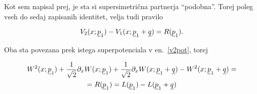 Kot sem napisal prej, je sta si supersimetri\v cna partnerja "`podobna"'. Torej poleg vseh do sedaj zapisanih
identitet, velja tudi pravilo

\begin{equation}
	V_2 (x; \underline{p}_1) - V_1 (x; \underline{p}_1 + \underline{q}) = R (\underline{p}_1).
\end{equation}

Oba sta povezana prek istega superpotenciala v en.~\eqref{v2pot}, torej

\begin{multline}
	W^2 (x; \underline{p}_1) + \frac{1}{\sqrt{2}}\partial_x W(x; \underline{p}_1) + \frac{1}{\sqrt{2}}\partial_x W (x; \underline{p}_1 + \underline{q}) - W^2
		(x; \underline{p}_1 + \underline{q}) =\\= R (\underline{p}_1) = L (\underline{p}_1) - L (\underline{p}_1 + \underline{q})
\end{multline}
